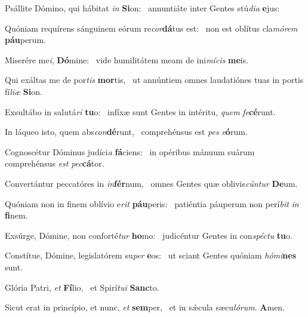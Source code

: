 \item Psállite Dómino, qui hábitat \textit{in} \textbf{Si}on:~\psstar{} annuntiáte inter Gentes stú\textit{dia} \textbf{e}jus:
\item Quóniam requírens sánguinem eórum re\textit{cor}\textbf{dá}tus est:~\psstar{} non est oblítus cla\textit{mórem} \textbf{páu}perum.
\item Miserére me\textit{i}, \textbf{Dó}mine:~\psstar{} vide humilitátem meam de ini\textit{mícis} \textbf{me}is.
\item Qui exáltas me de por\textit{tis} \textbf{mor}tis,~\psstar{} ut annúntiem omnes laudatiónes tuas in portis fí\textit{liæ} \textbf{Si}on.
\item Exsultábo in salutá\textit{ri} \textbf{tu}o:~\psstar{} infíxæ sunt Gentes in intéritu, \textit{quem} \textit{fe}\textbf{cé}runt.
\item In láqueo isto, quem abs\textit{con}\textbf{dé}runt,~\psstar{} comprehénsus est \textit{pes} \textit{e}\textbf{ó}rum.
\item Cognoscétur Dóminus judíci\textit{a} \textbf{fá}ciens:~\psstar{} in opéribus mánuum suárum comprehénsus \textit{est} \textit{pec}\textbf{cá}tor.
\item Convertántur peccatóres in \textit{in}\textbf{fér}num,~\psstar{} omnes Gentes quæ oblivis\textit{cúntur} \textbf{De}um.
\item Quóniam non in finem oblívio e\textit{rit} \textbf{páu}peris:~\psstar{} patiéntia páuperum non perí\textit{bit} \textit{in} \textbf{fi}nem.
\item Exsúrge, Dómine, non conforté\textit{tur} \textbf{ho}mo:~\psstar{} judicéntur Gentes in con\textit{spéctu} \textbf{tu}o.
\item Constítue, Dómine, legislatórem su\textit{per} \textbf{e}os:~\psstar{} ut sciant Gentes quóniam \textit{hómi}\textbf{nes} sunt.
\item Glória Patri, \textit{et} \textbf{Fí}lio,~\psstar{} et Spirí\textit{tui} \textbf{Sanc}to.
\item Sicut erat in princípio, et nunc, \textit{et} \textbf{sem}per,~\psstar{} et in sǽcula sæcu\textit{lórum}. \textbf{A}men.
